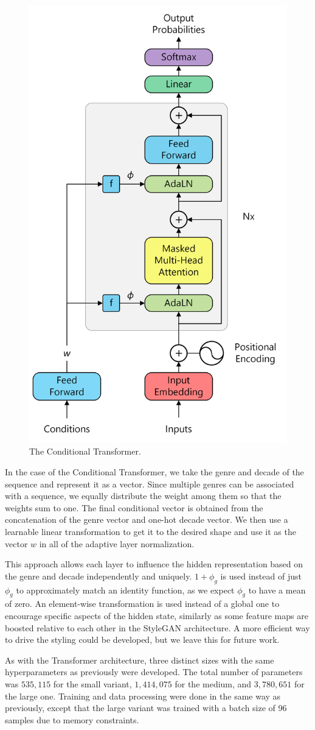 \documentclass{article}
\begin{document}
\begin{figure}[!htbp]
    \centering
    \includegraphics[width=0.35\linewidth]{images/conditional-transformer.png}
    \caption{The Conditional Transformer.}
    \label{fig:conditional_transformer}
\end{figure}

In the case of the Conditional Transformer, we take the genre and decade of the sequence and represent it as a vector. Since multiple genres can be associated with a sequence, we equally distribute the weight among them so that the weights sum to one. The final conditional vector is obtained from the concatenation of the genre vector and one-hot decade vector. We then use a learnable linear transformation to get it to the desired shape and use it as the vector $w$ in all of the adaptive layer normalization.

This approach allows each layer to influence the hidden representation based on the genre and decade independently and uniquely. $1 + \phi_g$ is used instead of just $\phi_g$ to approximately match an identity function, as we expect $\phi_g$ to have a mean of zero. An element-wise transformation is used instead of a global one to encourage specific aspects of the hidden state, similarly as some feature maps are boosted relative to each other in the StyleGAN architecture. A more efficient way to drive the styling could be developed, but we leave this for future work.

As with the Transformer architecture, three distinct sizes with the same hyperparameters as previously were developed. The total number of parameters was $535,115$ for the small variant, $1,414,075$ for the medium, and $3,780,651$ for the large one. Training and data processing were done in the same way as previously, except that the large variant was trained with a batch size of 96 samples due to memory constraints.
\end{document}
